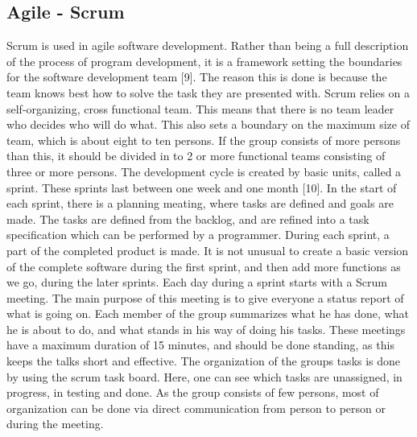 \subsection{Agile - Scrum}
Scrum is used in agile software development. Rather than being a full description of the process of program development, it is a framework setting the boundaries for the software development team [9]. The reason this is done is because the team knows best how to solve the task they are presented with.
\newline
\newline
Scrum relies on a self-organizing, cross functional team. This means that there is no team leader who decides who will do what. This also sets a boundary on the maximum size of team, which is about eight to ten persons. If the group consists of more persons than this, it should be divided in to 2 or more functional teams consisting of three or more persons.
\newline
\newline
The development cycle is created by basic units, called a sprint. These sprints last between one week and one month [10]. In the start of each sprint, there is a planning meating, where tasks are defined and goals are made. The tasks are defined from the backlog, and are refined into a task specification which can be performed by a programmer. During each sprint, a part of the completed product is made. It is not unusual to create a basic version of the complete software during the first sprint, and then add more functions as we go, during the later sprints.
\newline
\newline
Each day during a sprint starts with a Scrum meeting. The main purpose of this meeting is to give everyone a status report of what is going on. Each member of the group summarizes what he has done, what he is about to do, and what stands in his way of doing his tasks. These meetings have a maximum duration of 15 minutes, and should be done standing, as this keeps the talks short and effective.
\newline
\newline
The organization of the groups tasks is done by using the scrum task board. Here, one can see which tasks are unassigned, in progress, in testing and done. As the group consists of few persons, most of organization can be done via direct communication from person to person or during the meeting.

